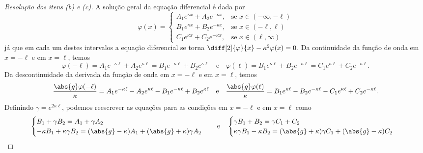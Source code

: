 \begin{proof}[Resolução dos itens (b) e (c)]
    A solução geral da equação diferencial é dada por
    \begin{equation*}
        \varphi(x) = \begin{cases}
            A_1 e^{\kappa x} + A_2 e^{-\kappa x},&\text{se }x \in (-\infty, -\ell)\\
            B_1 e^{\kappa x} + B_2 e^{-\kappa x},&\text{se }x \in (-\ell, \ell)\\
            C_1 e^{\kappa x} + C_2 e^{-\kappa x},&\text{se }x \in (\ell, \infty)
        \end{cases}
    \end{equation*}
    já que em cada um destes intervalos a equação diferencial se torna \(\diff[2]{\varphi}{x} - \kappa^2 \varphi(x) = 0\). Da continuidade da função de onda em \(x = -\ell\) e em \(x = \ell\), temos
    \begin{equation*}
        \varphi(-\ell) = A_1 e^{-\kappa \ell} + A_2 e^{\kappa \ell} = B_1 e^{- \kappa \ell} + B_2 e^{\kappa \ell}
        \quad\text{e}\quad
        \varphi(\ell) = B_1 e^{\kappa \ell} + B_2 e^{-\kappa \ell} = C_1 e^{\kappa \ell} + C_2 e^{-\kappa \ell}.
    \end{equation*}
    Da descontinuidade da derivada da função de onda em \(x = - \ell\) e em \(x = \ell\), temos
    \begin{equation*}
        \frac{\abs{g}\varphi(-\ell)}{\kappa} = A_1 e^{- \kappa \ell} - A_2 e^{\kappa \ell} - B_1 e^{- \kappa \ell} + B_2 e^{\kappa \ell}
        \quad\text{e}\quad
        \frac{\abs{g}\varphi(\ell)}{\kappa} = B_1 e^{\kappa \ell} - B_2 e^{-\kappa \ell} - C_1 e^{\kappa \ell} + C_2 e^{-\kappa \ell}.
    \end{equation*}
    Definindo \(\gamma = e^{2 \kappa \ell}\), podemos reescrever as equações para as condições em \(x = -\ell\) e em \(x = \ell\) como
    \begin{equation*}
        \begin{cases}
            B_1 + \gamma B_2 = A_1 + \gamma A_2\\
            - \kappa B_1 + \kappa\gamma B_2 = (\abs{g} - \kappa)A_1 + (\abs{g} + \kappa)\gamma A_2
        \end{cases}
        \quad\text{e}\quad
        \begin{cases}
            \gamma B_1  + B_2 = \gamma C_1 + C_2\\
            \kappa \gamma B_1 - \kappa B_2 = (\abs{g} + \kappa)\gamma C_1 + (\abs{g} - \kappa)C_2
        \end{cases}
    \end{equation*}

\end{proof}
